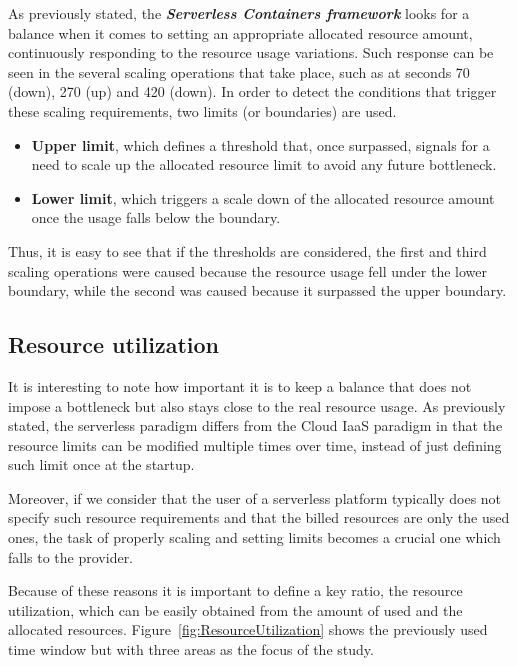 \documentclass[12pt]{article}
\begin{document}
As previously stated, the \textit{\textbf{Serverless Containers framework}} looks for a balance when it comes to setting an appropriate allocated resource amount, continuously responding to the resource usage variations. Such response can be seen in the several scaling operations that take place, such as at seconds 70 (down), 270 (up) and 420 (down). In order to detect the conditions that trigger these scaling requirements, two limits (or boundaries) are used.

\begin{itemize}
	\item \textbf{Upper limit}, which defines a threshold that, once surpassed, signals for a need to scale up the allocated resource limit to avoid any future bottleneck.
	\item \textbf{Lower limit}, which triggers a scale down of the allocated resource amount once the usage falls below the boundary.
\end{itemize}

Thus, it is easy to see that if the thresholds are considered, the first and third scaling operations were caused because the resource usage fell under the lower boundary, while the second was caused because it surpassed the upper boundary.

\subsection{Resource utilization}

It is interesting to note how important it is to keep a balance that does not impose a bottleneck but also stays close to the real resource usage. As previously stated, the serverless paradigm differs from the Cloud IaaS paradigm in that the resource limits can be modified multiple times over time, instead of just defining such limit once at the startup.

Moreover, if we consider that the user of a serverless platform typically does not specify such resource requirements and that the billed resources are only the used ones, the task of properly scaling and setting limits becomes a crucial one which falls to the provider.

Because of these reasons it is important to define a key ratio, the resource utilization, which can be easily obtained from the amount of used and the allocated resources. Figure~\ref{fig:ResourceUtilization} shows the previously used time window but with three areas as the focus of the study.
\end{document}

